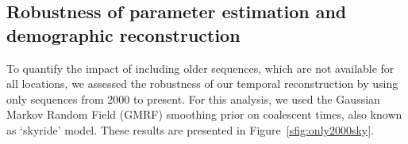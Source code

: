 \documentclass[a4paper,10pt]{article}
\begin{document}
% 


\subsection{Robustness of parameter estimation and demographic reconstruction}

To quantify the impact of including older sequences, which are not available for all locations, we assessed the robustness of our temporal reconstruction by using only sequences from 2000 to present.
For this analysis, we used the Gaussian Markov Random Field (GMRF) smoothing prior on coalescent times, also known as `skyride' model.
These results are presented in Figure~\ref{sfig:only2000sky}.
\end{document}
